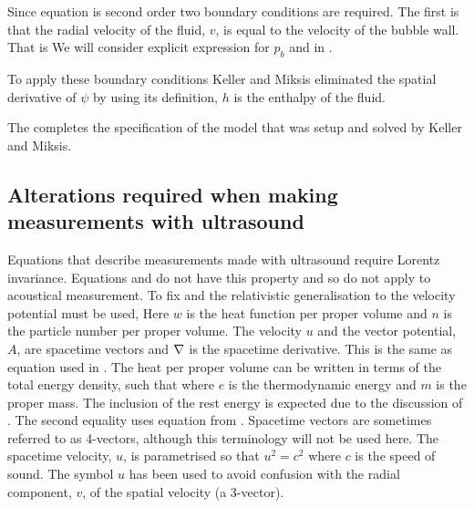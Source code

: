 Since equation  is second order two boundary conditions are required.
The first is that the radial velocity of the fluid, $v$, is equal to the velocity of the bubble wall.
That is 
We will consider explicit expression for $p_b$  and in .

To apply these boundary conditions Keller and Miksis eliminated the spatial derivative of $\psi$ by using its definition,
$h$ is the enthalpy of the fluid.

The completes the specification of the model that was setup and solved by Keller and Miksis\cite{Keller1980}.

\subsection{Alterations required when making measurements with ultrasound}
\label{sec:measurement:alterations}
Equations that describe  measurements made with ultrasound require  Lorentz invariance.
Equations  and  do not have this property and so 
do not apply to acoustical measurement.
To fix   and  the  relativistic generalisation to the velocity potential\cite{LandauBook} must be used,
Here $w$ is the heat function per proper volume and $n$ is the particle number per proper volume.
The velocity $u$ and the vector potential, $A$,  are spacetime vectors and $\nabla$ is the spacetime derivative.
This is the same as equation  used in . 
The heat per proper volume can be written in terms of the total energy density, 
such that\cite{LandauBook, Doran2003}
where $e$ is the thermodynamic energy and $m$ is the proper mass.
The inclusion of the rest energy is expected due to the discussion of .
The second equality uses equation  from .
Spacetime vectors are sometimes referred to as 4-vectors, although this terminology will not be used here.
The spacetime velocity, $u$, is parametrised so that $u^2 = c^2$ where $c$ is the speed of sound.
The symbol $u$ has been used to avoid confusion with the radial component, $v$, of the spatial velocity (a 3-vector).


